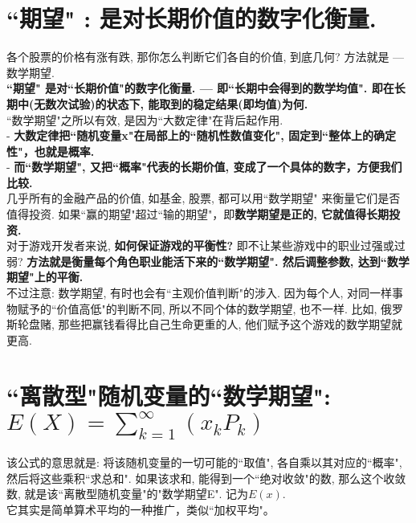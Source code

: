 \documentclass[UTF8]{ctexart}
\begin{document}
	
	
	
	
	
	\section{``期望" : 是对长期价值的数字化衡量.}
	
	各个股票的价格有涨有跌, 那你怎么判断它们各自的价值, 到底几何? 方法就是 --- 数学期望.  \\
	\textbf{``期望" 是对``长期价值"的数字化衡量. --- 即``长期中会得到的数学均值". 即在长期中(无数次试验)的状态下, 能取到的稳定结果(即均值)为何.} \\
	
	
	``数学期望"之所以有效, 是因为``大数定律"在背后起作用. \\
	- \textbf{大数定律把``随机变量x"在局部上的``随机性数值变化", 固定到``整体上的确定性"，也就是概率.} \\
	- \textbf{而``数学期望", 又把``概率"代表的长期价值, 变成了一个具体的数字，方便我们比较.} \\
	
	几乎所有的金融产品的价值, 如基金, 股票, 都可以用``数学期望" 来衡量它们是否值得投资. 如果``赢的期望"超过``输的期望"，即\textbf{数学期望是正的, 它就值得长期投资.} \\	
	对于游戏开发者来说, \textbf{如何保证游戏的平衡性?} 即不让某些游戏中的职业过强或过弱? \textbf{方法就是衡量每个角色职业能活下来的``数学期望". 然后调整参数, 达到``数学期望"上的平衡.} \\
	
	
	不过注意: 数学期望, 有时也会有``主观价值判断"的涉入. 因为每个人, 对同一样事物赋予的``价值高低"的判断不同, 所以不同个体的数学期望, 也不一样. 比如, 俄罗斯轮盘赌, 那些把赢钱看得比自己生命更重的人, 他们赋予这个游戏的数学期望就更高. 
	
	
	
	
	
	\section{``离散型"随机变量的``数学期望": $E(X)= \sum_{k=1}^{\infty} (x_k P_k)$}
	
	该公式的意思就是: 将该随机变量的一切可能的``取值", 各自乘以其对应的``概率", 然后将这些乘积``求总和". 如果该求和, 能得到一个``绝对收敛"的数, 那么这个收敛数, 就是该``离散型随机变量"的"数学期望E". 记为$E(x)$. \\
	它其实是简单算术平均的一种推广，类似``加权平均"。\\
	
\end{document}
